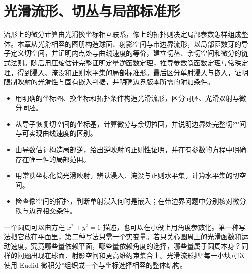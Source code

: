 
% 
% 

\chapter{光滑流形、切丛与局部标准形}
\label{g1:ch:11}

\begin{chapterabstract}
	流形上的微分计算由光滑换坐标相互联系，像上的拓扑则决定局部参数怎样组成整体。本章从光滑相容的图册构造球面、射影空间与带边界流形，以局部函数芽的导子定义切空间，并证明内点处与曲线速度的等价，建立切丛、余切空间和微分的链式法则。随后用压缩估计完整证明定量逆函数定理，推导参数隐函数定理与常秩定理，得到浸入、淹没和正则水平集的局部标准形。最后区分单射浸入与嵌入，证明限制映射的光滑性与固有嵌入判据，并明确边界版本所需的附加条件。
\end{chapterabstract}

\begin{learninggoals}
	\begin{itemize}
		\item 用明确的坐标图、换坐标和拓扑条件构造光滑流形，区分同胚、光滑双射与微分同胚。
		\item 从导子恢复切空间的坐标基，计算微分与余切拉回，并说明边界处完整切空间与可实现曲线速度的区别。
		\item 由导数估计构造局部逆，给出逆映射的正则性证明，并在有参数的方程中明确存在唯一性的局部范围。
		\item 用常秩坐标化简光滑映射，辨认浸入、淹没与正则水平集，计算水平集的切空间。
		\item 检查像空间的拓扑，判断单射浸入何时是嵌入；在带边界问题中分别核对微分秩与边界相交条件。
	\end{itemize}
\end{learninggoals}

一个圆周可以由方程 \(x^2+y^2=1\) 描述，也可以在小段上用角度参数化。第一种写法把它放在平面里，第二种写法只需一个实变量。若只关心圆周上的光滑函数和运动速度，究竟哪些量依赖平面，哪些量依赖角度的选择，哪些量属于圆周本身？同样的问题出现在球面、射影空间和更高维约束集合上。光滑流形把“每一小块可以使用 Euclid 微积分”组织成一个与坐标选择相容的整体结构。

